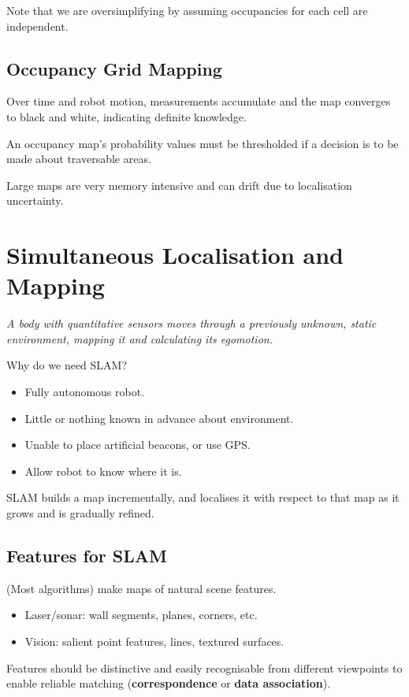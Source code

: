 \documentclass[11pt]{article}
\begin{document}
Note that we are oversimplifying by assuming occupancies for each cell are independent.

\subsection{Occupancy Grid Mapping}
Over time and robot motion, measurements accumulate and the map converges to black and white, indicating definite knowledge.

An occupancy map's probability values must be thresholded if a decision is to be made about traversable areas.

Large maps are very memory intensive and can drift due to localisation uncertainty.

\section{Simultaneous Localisation and Mapping}
\textit{A body with quantitative sensors moves through a previously unknown, static environment, mapping it and calculating its egomotion.}

Why do we need SLAM?
\begin{itemize}
  \item Fully autonomous robot.
  \item Little or nothing known in advance about environment.
  \item Unable to place artificial beacons, or use GPS.
  \item Allow robot to know where it is.
\end{itemize}

SLAM builds a map incrementally, and localises it with respect to that map as it grows and is gradually refined.

\subsection{Features for SLAM}
(Most algorithms) make maps of natural scene features.
\begin{itemize}
  \item Laser/sonar: wall segments, planes, corners, etc.\
  \item Vision: salient point features, lines, textured surfaces.
\end{itemize}

Features should be distinctive and easily recognisable from different viewpoints to enable reliable matching (\textbf{correspondence} or \textbf{data association}).
\end{document}
